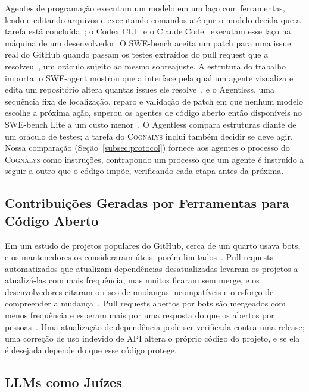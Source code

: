 \documentclass[conference]{IEEEtran}
\newcommand{\system}{\textsc{Cognalys}}
\begin{document}
Agentes de programação executam um modelo em um laço com ferramentas, lendo e
editando arquivos e executando comandos até que o modelo decida que a tarefa
está concluída~\cite{yang2024sweagent}; o Codex CLI~\cite{openai2026codex} e o
Claude Code~\cite{anthropic2026claudecode} executam esse laço na máquina de um
desenvolvedor. O SWE-bench aceita um patch para uma issue real do GitHub quando
passam os testes extraídos do pull request que a resolveu~\cite{jimenez2024swebench},
um oráculo sujeito ao mesmo sobreajuste. A estrutura do trabalho importa: o
SWE-agent mostrou que a interface pela qual um agente visualiza e edita um
repositório altera quantas issues ele resolve~\cite{yang2024sweagent}, e o
Agentless, uma sequência fixa de localização, reparo e validação de patch em que
nenhum modelo escolhe a próxima ação, superou os agentes de código aberto então
disponíveis no SWE-bench Lite a um custo menor~\cite{xia2025agentless}. O
Agentless compara estruturas diante de um oráculo de testes; a tarefa do
\system{} inclui também decidir se deve agir. Nossa comparação (Seção~\ref{subsec:protocol}) fornece aos agentes o
processo do \system{} como instruções, contrapondo um processo que um agente é
instruído a seguir a outro que o código impõe, verificando cada etapa antes da
próxima.

\subsection{Contribuições Geradas por Ferramentas para Código Aberto}
\label{subsec:bots}

Em um estudo de projetos populares do GitHub, cerca de um quarto usava bots, e
os mantenedores os consideraram úteis, porém limitados~\cite{wessel2018bots}.
Pull requests automatizados que atualizam dependências desatualizadas levaram os
projetos a atualizá-las com mais frequência, mas muitos ficaram sem merge, e os
desenvolvedores citaram o risco de mudanças incompatíveis e o esforço de
compreender a
mudança~\cite{mirhosseini2017autopr}. Pull requests abertos por bots são
mergeados com menos frequência e esperam mais por uma resposta do que os abertos
por pessoas~\cite{wyrich2021botprs}. Uma atualização de dependência pode ser
verificada contra uma release; uma correção de uso indevido de API altera o
próprio código do projeto, e se ela é desejada depende do que esse código
protege.

\subsection{LLMs como Juízes}
\label{subsec:judges-bg}
\end{document}
